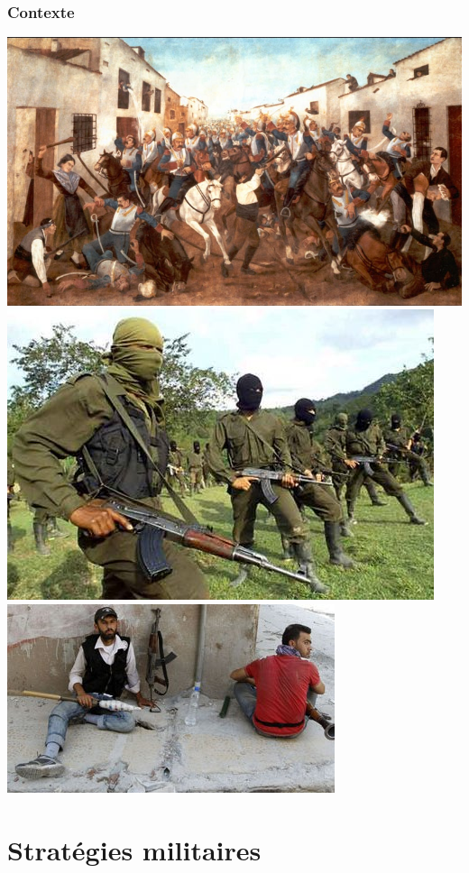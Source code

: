 \documentclass{article}
\begin{document}
\subsubsection{Contexte}
\includegraphics[width=\linewidth]{../ressources/valdepenas}
\includegraphics[]{../ressources/guerrilla_colombia}
\includegraphics[]{../ressources/rebel_syrie}
\cite{valdepenas,guerrilla_colombia,rebel_syrie}


\section{Stratégies militaires}
\end{document}
